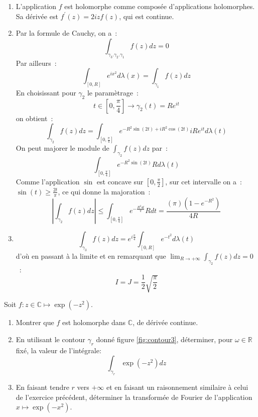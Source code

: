 \begin{enumerate}
\item L'application $f$ est holomorphe comme composée d'applications
holomorphes. Sa dérivée est $f^\prime(z) = 2 i z f(z)$, qui est continue. 
\item
Par la formule de Cauchy, on a~:
\[
\int_{\gamma_3 . \gamma_2 . \gamma_1} f(z) dz = 0
\]
Par ailleurs~:
\[
\int_{[0,R]} e^{ix^2}d \lambda(x) = \int_{\gamma_1} f(z) dz
\]
En choisissant pour $\gamma_2$ le paramètrage~:
\[
t \in [0, \frac{\pi}{4}] \to \gamma_2(t) = R e^{it}
\]
on obtient~:
\[
\int_{\gamma_2} f(z) dz = \int_{[0, \frac{\pi}{4}]} e^{-R^2 \sin (2t)
+ i R^2 \cos(2t)} i R e^{it} d \lambda(t)
\]
On peut majorer le module de $\int_{\gamma_2} f(z) dz$ par~:
\[
\int_{[0, \frac{\pi}{4}]} e^{-R^2 \sin (2t)}  R d \lambda(t)
\]
Comme l'application $\sin$ est concave sur $[0, \frac{\pi}{2}]$, sur
cet intervalle on a~: $\sin(t) \geq \frac{2 t}{\pi}$, ce qui donne la
majoration~:
\[
\left | \int_{\gamma_2} f(z) dz \right | \leq 
\int_{[0, \frac{\pi}{4}]} e^{-\frac{R^2 4 t}{\pi}} R dt =
\frac{(\pi)(1- e^{-R^2})}{4 R}
\]
\item
\[
\int_{\gamma_3} f(z) dz = e^{i \frac{\pi}{4}} \int_{[0,R]} e^{-t^2} d\lambda(t)
\]
d'où en passant à la limite et en remarquant que $\lim_{R \to
+\infty}\int_{\gamma_2} f(z) dz = 0$~:
\[
I = J = \frac{1}{2} \sqrt{\frac{\pi}{2}}
\]
\end{enumerate}
\begin{fex}
 Soit $f \colon z \in \mathbb{C} \mapsto \exp(-z^2)$.
\begin{enumerate}
  \item Montrer que $f$ est holomorphe dans $\mathbb{C}$, de dérivée continue.
  \item En utilisant le contour $\gamma_r$ donné figure \ref{fig:contour3},
déterminer, pour
  $\omega \in \mathbb{R}$ fixé, la valeur de l'intégrale:
  \[
  \int_{\gamma_r} \exp(-z^2)dz
  \]
  \item En faisant tendre $r$ vers $+\infty$ et en faisant un raisonnement
  similaire à celui de l'exercice précédent, déterminer la transformée de
  Fourier de l'application $x \mapsto \exp(-x^2)$.
\end{enumerate}
\end{fex}
